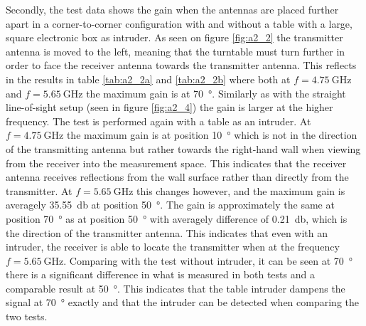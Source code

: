 Secondly, the test data shows the gain when the antennas are placed further apart in a corner-to-corner configuration with and without a table with a large, square electronic box as intruder. As seen on figure \ref{fig:a2_2} the transmitter antenna is moved to the left, meaning that the turntable must turn further in order to face the receiver antenna towards the transmitter antenna. This reflects in the results in table \ref{tab:a2_2a} and \ref{tab:a2_2b} where both at $f=\SI{4.75}{\giga\hertz}$ and $f=\SI{5.65}{\giga\hertz}$ the maximum gain is at \SI{70}{\degree}. Similarly as with the straight line-of-sight setup (seen in figure \ref{fig:a2_4}) the gain is larger at the higher frequency. The test is performed again with a table as an intruder. At $f=\SI{4.75}{\giga\hertz}$ the maximum gain is at position \SI{10}{\degree} which is not in the direction of the transmitting antenna but rather towards the right-hand wall when viewing from the receiver into the measurement space. This indicates that the receiver antenna receives reflections from the wall surface rather than directly from the transmitter. At $f=\SI{5.65}{\giga\hertz}$ this changes however, and the maximum gain is averagely \SI{35.55}{\decibel} at position \SI{50}{\degree}. The gain is approximately the same at position \SI{70}{\degree} as at position \SI{50}{\degree} with averagely difference of \SI{0.21}{\decibel}, which is the direction of the transmitter antenna. This indicates that even with an intruder, the receiver is able to locate the transmitter when at the frequency $f=\SI{5.65}{\giga\hertz}$. Comparing with the test without intruder, it can be seen at \SI{70}{\degree} there is a significant difference in what is measured in both tests and a comparable result at \SI{50}{\degree}. This indicates that the table intruder dampens the signal at \SI{70}{\degree} exactly and that the intruder can be detected when comparing the two tests.

